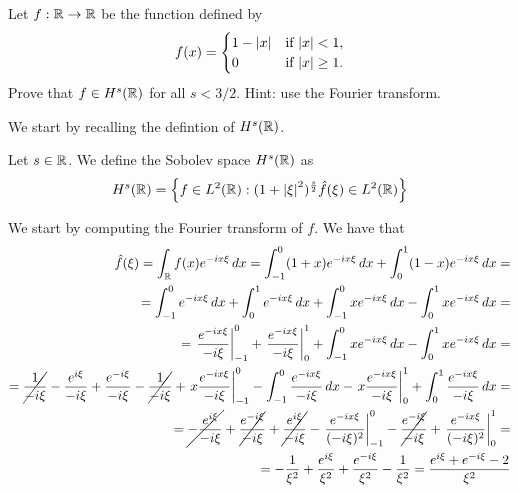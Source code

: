 \newpage
\begin{exercise}
    Let \(f : \mathbb{R} \to \mathbb{R}\) be the function defined by
    \[
        f(x) = \begin{cases}
            1 - \abs{x} & \text{if } \abs{x} < 1,    \\
            0           & \text{if } \abs{x} \geq 1.
        \end{cases}
    \]
    Prove that \(f \in H^s(\mathbb{R})\) for all \(s < 3/2\). Hint: use the Fourier
    transform.
\end{exercise}
We start by recalling the defintion of \(H^s(\mathbb{R})\).
\begin{remark}
    Let \(s \in \mathbb{R}\). We define the Sobolev space \(H^s(\mathbb{R})\) as
    \[
        H^s(\mathbb{R}) = \left\{ f \in L^2(\mathbb{R}) : (1 + \abs{\xi}^2)^{\frac{s}{2}} \hat{f}(\xi) \in L^2(\mathbb{R}) \right\}
    \]
\end{remark}
We start by computing the Fourier transform of \(f\). We have that
\[
    \begin{split}
        \hat{f}(\xi) = \int_{\mathbb{R}} f(x) e^{-i x \xi} \, dx = \int_{-1}^0 (1 + x) e^{-i x \xi} \, dx + \int_0^1 (1 - x) e^{-i x \xi} \, dx =                                                                                                                                                                                         \\
        = \int_{-1}^0 e^{-i x \xi} \, dx + \int_0^1 e^{-i x \xi} \, dx + \int_{-1}^0 x e^{-i x \xi} \, dx - \int_0^1 x e^{-i x \xi} \, dx =                                                                                                                                                                                        \\
        = \left.  \frac{e^{-i x \xi}}{-i \xi} \right|_{-1}^0 + \left. \frac{e^{-i x \xi}}{-i \xi} \right|_0^1 + \int_{-1}^0 x e^{-i x \xi} \, dx - \int_0^1 x e^{-i x \xi} \, dx =                                                                                                                                                 \\
        = \cancel{\frac{1}{- i \xi}} - \frac{e^{i \xi}}{- i \xi} + \frac{e^{-i \xi}}{- i \xi} - \cancel{\frac{1}{- i \xi}} + \left. x \frac{e^{-i x \xi}}{-i \xi} \right|_{-1}^0 - \int_{-1}^0 \frac{e^{-i x \xi}}{-i \xi} \, dx - \left. x \frac{e^{-i x \xi}}{-i \xi} \right|_0^1 + \int_0^1 \frac{e^{-i x \xi}}{-i \xi} \, dx = \\
        = \cancel{- \frac{e^{i \xi}}{- i \xi}} + \cancel{\frac{e^{-i \xi}}{- i \xi}} + \cancel{\frac{e^{i \xi}}{- i \xi}} - \left. \frac{e^{-i x \xi}}{(-i \xi)^2} \right|_{-1}^0 - \cancel{\frac{e^{-i \xi}}{- i \xi}} + \left. \frac{e^{-i x \xi}}{(-i \xi)^2} \right|_0^1 =                                                     \\
        = -\frac{1}{\xi^2} + \frac{e^{i \xi}}{\xi^2} + \frac{e^{-i \xi}}{\xi^2} - \frac{1}{\xi^2} = \frac{e^{i \xi} + e^{-i \xi} - 2}{\xi^2}
    \end{split}
\]
